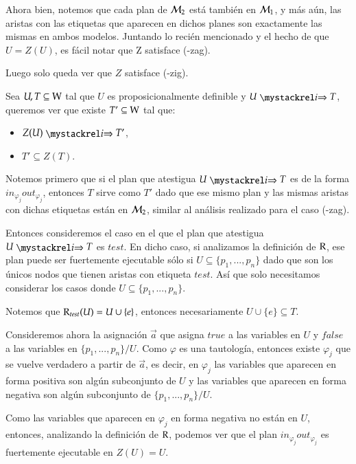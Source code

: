 \begin{demostracion}
\begin{itemize}
    Ahora bien, notemos que cada plan de $\mathcal{M}_2$ está también en $\mathcal{M}_1$, y más aún, las aristas con las etiquetas que aparecen en dichos planes son exactamente las mismas en ambos modelos. Juntando lo recién mencionado y el hecho de que $U = Z(U)$, es fácil notar que Z satisface (\KHilogic-zag).

    Luego solo queda ver que $Z$ satisface (\KHilogic-zig).

    Sea $U, T \subseteq \mathrm{W}$ tal que $U$ es proposicionalmente definible y $U \ultsExecAgi T$, queremos ver que existe $T' \subseteq \mathrm{W}$ tal que:

    \begin{multicols}{2}
        \begin{itemize}
            \item $Z(U) \ultsExecAgi T'$, 
            \item $T' \subseteq Z(T)$.
        \end{itemize}
    \end{multicols}

    Notemos primero que si el plan que atestigua $U \ultsExecAgi T$ es de la forma $in_{\varphi_j}out_{\varphi_j}$, entonces $T$ sirve como $T'$ dado que ese mismo plan y las mismas aristas con dichas etiquetas están en $\mathcal{M}_2$, similar al análisis realizado para el caso (\KHilogic-zag).

    Entonces consideremos el caso en el que el plan que atestigua $U \ultsExecAgi T$ es $test$. En dicho caso, si analizamos la definición de $\mathrm{R}$, ese plan puede ser fuertemente ejecutable sólo si $U \subseteq \{p_1,...,p_n\}$ dado que son los únicos nodos que tienen aristas con etiqueta $test$. Así que solo necesitamos considerar los casos donde $U \subseteq \{p_1,...,p_n\}$.

    Notemos que $\mathrm{R}_{test}(U) = U \cup \{e\}$, entonces necesariamente $U \cup \{e\} \subseteq T$.

    Consideremos ahora la asignación $\overrightarrow{a}$ que asigna $true$ a las variables en $U$ y $false$ a las variables en $\{p_1,...,p_n\} / U$. Como $\varphi$ es una tautología, entonces existe $\varphi_j$ que se vuelve verdadero a partir de $\overrightarrow{a}$, es decir, en $\varphi_j$ las variables que aparecen en forma positiva son algún subconjunto de $U$ y las variables que aparecen en forma negativa son algún subconjunto de $\{p_1,...,p_n\}/U$.

    Como las variables que aparecen en $\varphi_j$ en forma negativa no están en $U$, entonces, analizando la definición de $\mathrm{R}$, podemos ver que el plan $in_{\varphi_j}out_{\varphi_j}$ es fuertemente ejecutable en $Z(U) = U$. 
    

\end{itemize}
\end{demostracion}

